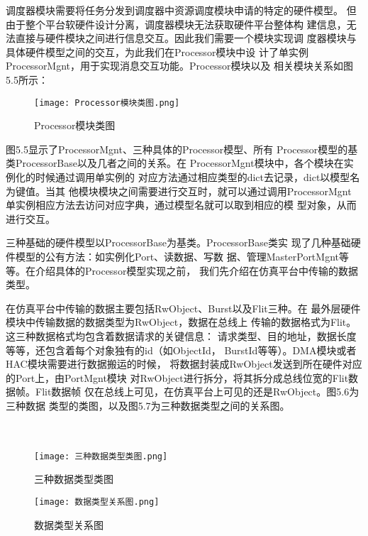 调度器模块需要将任务分发到调度器中资源调度模块申请的特定的硬件模型。
但由于整个平台软硬件设计分离，调度器模块无法获取硬件平台整体构
建信息，无法直接与硬件模块之间进行信息交互。因此我们需要一个模块实现调
度器模块与具体硬件模型之间的交互，为此我们在Processor模块中设
计了单实例ProcessorMgnt，用于实现消息交互功能。Processor模块以及
相关模块关系如图5.5所示：

\begin{figure}[!h]
    \centering
    \texttt{[image: Processor模块类图.png]}
    \caption{Processor模块类图}
    \label{fig:badge}
\end{figure}

图5.5显示了ProcessorMgnt、三种具体的Processor模型、所有
Processor模型的基类ProcessorBase以及几者之间的关系。在
ProcessorMgnt模块中，各个模块在实例化的时候通过调用单实例的
对应方法通过相应类型的dict去记录，dict以模型名为键值。当其
他模块模块之间需要进行交互时，就可以通过调用ProcessorMgnt
单实例相应方法去访问对应字典，通过模型名就可以取到相应的模
型对象，从而进行交互。

三种基础的硬件模型以ProcessorBase为基类。ProcessorBase类实
现了几种基础硬件模型的公有方法：如实例化Port、读数据、写数
据、管理MasterPortMgnt等等。在介绍具体的Processor模型实现之前，
我们先介绍在仿真平台中传输的数据类型。

在仿真平台中传输的数据主要包括RwObject、Burst以及Flit三种。在
最外层硬件模块中传输数据的数据类型为RwObject，数据在总线上
传输的数据格式为Flit。这三种数据格式均包含着数据请求的关键信息：
请求类型、目的地址，数据长度等等，还包含着每个对象独有的id（如ObjectId，
BurstId等等）。DMA模块或者HAC模块需要进行数据搬运的时候，
将数据封装成RwObject发送到所在硬件对应的Port上，由PortMgnt模块
对RwObject进行拆分，将其拆分成总线位宽的Flit数据帧。Flit数据帧
仅在总线上可见，在仿真平台上可见的还是RwObject。图5.6为三种数据
类型的类图，以及图5.7为三种数据类型之间的关系图。
\\
\\
\\

\begin{figure}
    \centering
    \texttt{[image: 三种数据类型类图.png]}
    \caption{三种数据类型类图}
    \label{fig:badge}
\end{figure}

\begin{figure}
    \centering
    \texttt{[image: 数据类型关系图.png]}
    \caption{数据类型关系图}
    \label{fig:badge}
\end{figure}



